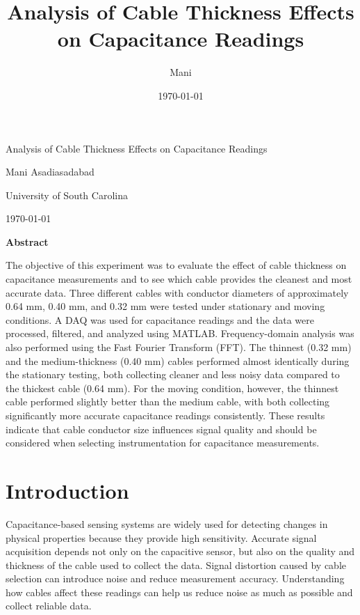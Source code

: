 \documentclass[11pt]{article}
\title{Analysis of Cable Thickness Effects on Capacitance Readings}
\author{Mani}
\date{\today}
\begin{document}
	
	\begin{titlepage}
		\centering
		{\Huge Analysis of Cable Thickness Effects on Capacitance Readings\par}
		
		\vspace{1cm}
		
		{\large Mani Asadiasadabad\par}
		
		\vfill
		
		University of South Carolina
		
		\today
	\end{titlepage}
	\newpage
	
	\begin{center}
		{\Large\bfseries Abstract\par}
	\end{center}
	
	\noindent
	The objective of this experiment was to evaluate the effect of cable thickness on capacitance measurements and to see which cable provides the cleanest and most accurate data. Three different cables with conductor diameters of approximately 0.64 mm, 0.40 mm, and 0.32 mm were tested under stationary and moving conditions. A DAQ was used for capacitance readings and the data were processed, filtered, and analyzed using MATLAB. Frequency-domain analysis was also performed using the Fast Fourier Transform (FFT). The thinnest (0.32 mm) and the medium-thickness (0.40 mm) cables performed almost identically during the stationary testing, both collecting cleaner and less noisy data compared to the thickest cable (0.64 mm). For the moving condition, however, the thinnest cable performed slightly better than the medium cable, with both collecting significantly more accurate capacitance readings consistently. These results indicate that cable conductor size influences signal quality and should be considered when selecting instrumentation for capacitance measurements.
	
	\section{Introduction}
	
	Capacitance-based sensing systems are widely used for detecting changes in physical properties because they provide high sensitivity. Accurate signal acquisition depends not only on the capacitive sensor, but also on the quality and thickness of the cable used to collect the data. Signal distortion caused by cable selection can introduce noise and reduce measurement accuracy. Understanding how cables affect these readings can help us reduce noise as much as possible and collect reliable data.
	
\end{document}
